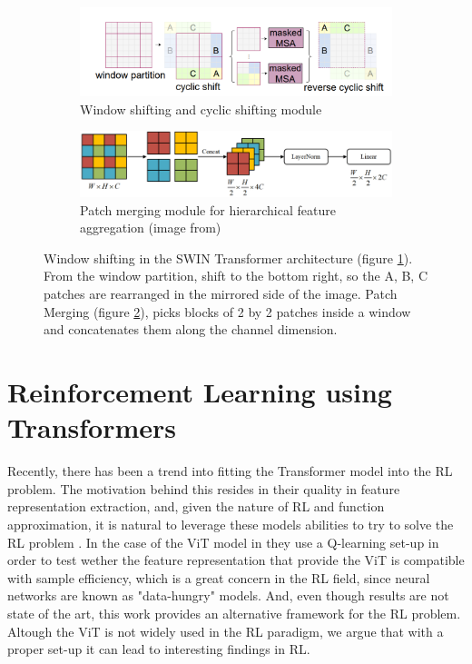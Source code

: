 \begin{figure}[!h]
	\centering
	\begin{subfigure}{\textwidth}
		\centering
		\includegraphics[width=0.8\linewidth]{figures/windowshifting}
		\caption{Window shifting and cyclic shifting module}
		\label{fig:windowshifting}
	\end{subfigure}
	\hfill
	\begin{subfigure}{\textwidth}
		\centering
		\includegraphics[width=0.9\linewidth]{figures/patch_merging}
		\caption{Patch merging module for hierarchical feature aggregation (image from\cite{swin_unet})}
		\label{fig:patchmerging}
	\end{subfigure}
	\caption{Window shifting in the SWIN Transformer architecture (figure \ref{fig:windowshifting}). From the window partition, shift to the bottom right, so the A, B, C patches are rearranged in the mirrored side of the image. Patch Merging (figure \ref{fig:patchmerging}), picks blocks of 2 by 2 patches inside a window and concatenates them along the channel dimension.}
	\label{fig:combined}
\end{figure}


\section{Reinforcement Learning using Transformers}
\label{sec:rl-with-attention}

Recently, there has been a trend into fitting the Transformer model into the RL problem. The motivation behind this resides in their quality in feature representation extraction, and, given the nature of RL and function approximation, it is natural to leverage these models abilities to try to solve the RL problem \cite{rl_transformers2023survey}. In the case of the ViT model in \cite{vit_q_learning_sample_eff} they use a Q-learning set-up in order to test wether the feature representation that provide the ViT is compatible with sample efficiency, which is a great concern in the RL field, since neural networks are known as "data-hungry" models. And, even though results are not state of the art, this work provides an alternative framework for the RL problem. Altough the ViT is not widely used in the RL paradigm, we argue that with a proper set-up it can lead to interesting findings in RL.

